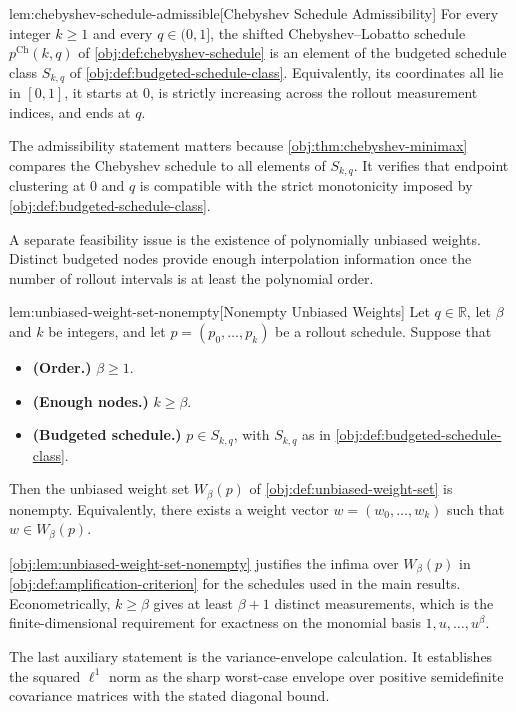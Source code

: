 \begin{lemmav}{lem:chebyshev-schedule-admissible}[Chebyshev Schedule Admissibility]
For every integer $k \ge 1$ and every $q \in (0,1]$, the shifted Chebyshev--Lobatto schedule $p^{\mathrm{Ch}}(k,q)$ of \cref{obj:def:chebyshev-schedule} is an element of the budgeted schedule class $S_{k,q}$ of \cref{obj:def:budgeted-schedule-class}. Equivalently, its coordinates all lie in $[0,1]$, it starts at $0$, is strictly increasing across the rollout measurement indices, and ends at $q$.
\end{lemmav}

The admissibility statement matters because \cref{obj:thm:chebyshev-minimax} compares the Chebyshev schedule to all elements of \(S_{k,q}\). It verifies that endpoint clustering at \(0\) and \(q\) is compatible with the strict monotonicity imposed by \cref{obj:def:budgeted-schedule-class}.

A separate feasibility issue is the existence of polynomially unbiased weights. Distinct budgeted nodes provide enough interpolation information once the number of rollout intervals is at least the polynomial order.

\begin{lemmav}{lem:unbiased-weight-set-nonempty}[Nonempty Unbiased Weights]
Let \(q\in\mathbb R\), let \(\beta\) and \(k\) be integers, and let \(p=(p_0,\ldots,p_k)\) be a rollout schedule. Suppose that
\begin{itemize}
\item \textbf{(Order.)} \(\beta\ge 1\).
\item \textbf{(Enough nodes.)} \(k\ge \beta\).
\item \textbf{(Budgeted schedule.)} \(p\in S_{k,q}\), with \(S_{k,q}\) as in \cref{obj:def:budgeted-schedule-class}.
\end{itemize}
Then the unbiased weight set \(W_\beta(p)\) of \cref{obj:def:unbiased-weight-set} is nonempty. Equivalently, there exists a weight vector \(w=(w_0,\ldots,w_k)\) such that \(w\in W_\beta(p)\).
\end{lemmav}

\cref{obj:lem:unbiased-weight-set-nonempty} justifies the infima over \(W_\beta(p)\) in \cref{obj:def:amplification-criterion} for the schedules used in the main results. Econometrically, \(k\ge\beta\) gives at least \(\beta+1\) distinct measurements, which is the finite-dimensional requirement for exactness on the monomial basis \(1,u,\ldots,u^\beta\).

The last auxiliary statement is the variance-envelope calculation. It establishes the squared \(\ell^1\) norm as the sharp worst-case envelope over positive semidefinite covariance matrices with the stated diagonal bound.

